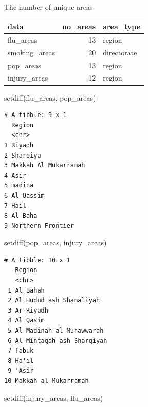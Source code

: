 \documentclass[
  letterpaper,
  DIV=11,
  numbers=noendperiod]{scrreprt}
\newenvironment{Shaded}{\begin{snugshade}}{\end{snugshade}}
\newcommand{\FunctionTok}[1]{\textcolor[rgb]{0.28,0.35,0.67}{#1}}
\newcommand{\NormalTok}[1]{\textcolor[rgb]{0.00,0.23,0.31}{#1}}
\begin{document}
The number of unique areas

\begin{longtable}[]{@{}lrl@{}}
\toprule\noalign{}
data & no\_areas & area\_type \\
\midrule\noalign{}
\endhead
\bottomrule\noalign{}
\endlastfoot
flu\_areas & 13 & region \\
smoking\_areas & 20 & directorate \\
pop\_areas & 13 & region \\
injury\_areas & 12 & region \\
\end{longtable}

\begin{Shaded}
\begin{Highlighting}[]
\FunctionTok{setdiff}\NormalTok{(flu\_areas, pop\_areas)}
\end{Highlighting}
\end{Shaded}

\begin{verbatim}
# A tibble: 9 x 1
  Region              
  <chr>               
1 Riyadh              
2 Sharqiya            
3 Makkah Al Mukarramah
4 Asir                
5 madina              
6 Al Qassim           
7 Hail                
8 Al Baha             
9 Northern Frontier   
\end{verbatim}

\begin{Shaded}
\begin{Highlighting}[]
\FunctionTok{setdiff}\NormalTok{(pop\_areas, injury\_areas)}
\end{Highlighting}
\end{Shaded}

\begin{verbatim}
# A tibble: 10 x 1
   Region                   
   <chr>                    
 1 Al Bahah                 
 2 Al Hudud ash Shamaliyah  
 3 Ar Riyadh                
 4 Al Qasim                 
 5 Al Madinah al Munawwarah 
 6 Al Mintaqah ash Sharqiyah
 7 Tabuk                    
 8 Ha'il                    
 9 'Asir                    
10 Makkah al Mukarramah     
\end{verbatim}

\begin{Shaded}
\begin{Highlighting}[]
\FunctionTok{setdiff}\NormalTok{(injury\_areas, flu\_areas)}
\end{Highlighting}
\end{Shaded}
\end{document}

